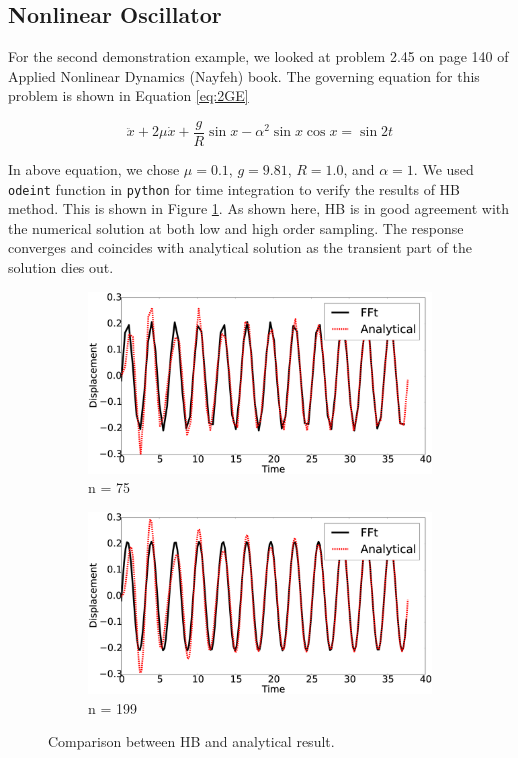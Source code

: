 \documentclass[12pt, a4paper]{extarticle}
\begin{document}
\subsection{Nonlinear Oscillator}
For the second demonstration example, we looked at problem 2.45 on page 140 of Applied Nonlinear Dynamics (Nayfeh) book. The governing equation for this problem is shown in Equation \eqref{eq:2GE}

\begin{equation}\label{eq:2GE}
	\ddot{x} + 2 \mu \dot{x} + \frac{g}{R} \sin x - \alpha^2 \sin x \cos x = \sin 2t
\end{equation}

In above equation, we chose $\mu = 0.1$, $g = 9.81$, $R = 1.0$, and $\alpha = 1$. We used \texttt{odeint} function in \texttt{python} for time integration to verify the results of HB method. This is shown in Figure \ref{fig:R2}. As shown here, HB is in good agreement with the numerical solution at both low and high order sampling. The response converges and coincides with analytical solution as the transient part of the solution dies out.

\begin{figure}[H]
	\centering
	\begin{subfigure}[h]{8.0 cm}
		\includegraphics[width=8.0 cm]{figure/2N75.eps}
		\caption{n = 75}
	\end{subfigure}
	\begin{subfigure}[h]{8.0 cm}
        \includegraphics[width=8.0 cm]{figure/2N199.eps}
		\caption{n = 199}
    \end{subfigure}
    \caption{Comparison between HB and analytical result.}
    \label{fig:R2}
\end{figure}
\end{document}
